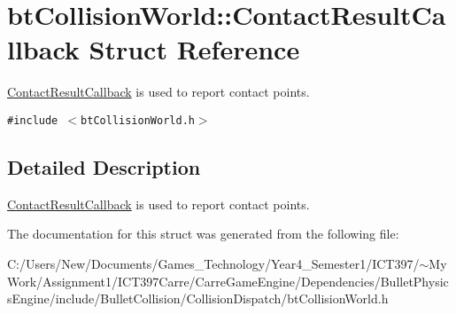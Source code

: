 \hypertarget{structbt_collision_world_1_1_contact_result_callback}{
\section{btCollisionWorld::ContactResultCallback Struct Reference}
\label{structbt_collision_world_1_1_contact_result_callback}
}
\hyperlink{structbt_collision_world_1_1_contact_result_callback}{ContactResultCallback} is used to report contact points.  


{\tt \#include $<$btCollisionWorld.h$>$}



\subsection{Detailed Description}
\hyperlink{structbt_collision_world_1_1_contact_result_callback}{ContactResultCallback} is used to report contact points. 

The documentation for this struct was generated from the following file:\begin{CompactItemize}
\item 
C:/Users/New/Documents/Games\_\-Technology/Year4\_\-Semester1/ICT397/$\sim$My Work/Assignment1/ICT397Carre/CarreGameEngine/Dependencies/BulletPhysicsEngine/include/BulletCollision/CollisionDispatch/btCollisionWorld.h\end{CompactItemize}
